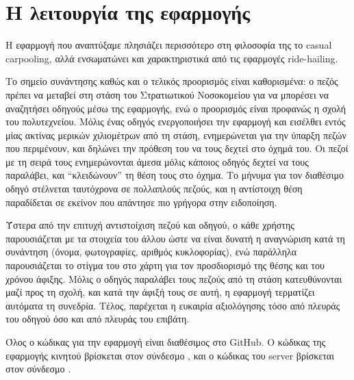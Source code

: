\documentclass[../thesis.tex]{subfiles}
\begin{document}
\section{Η λειτουργία της εφαρμογής}

Η εφαρμογή που αναπτύξαμε πλησιάζει περισσότερο στη φιλοσοφία της το casual carpooling, αλλά ενσωματώνει και χαρακτηριστικά από τις εφαρμογές ride-hailing.

Το σημείο συνάντησης καθώς και ο τελικός προορισμός είναι καθορισμένα: ο πεζός πρέπει να μεταβεί στη στάση του Στρατιωτικού Νοσοκομείου για να μπορέσει να αναζητήσει οδηγούς μέσω της εφαρμογής, ενώ ο προορισμός είναι προφανώς η σχολή του πολυτεχνείου.
Μόλις ένας οδηγός ενεργοποιήσει την εφαρμογή και εισέλθει εντός μίας ακτίνας μερικών χιλιομέτρων από τη στάση, ενημερώνεται για την ύπαρξη πεζών που περιμένουν, και δηλώνει την πρόθεση του να τους δεχτεί στο όχημά του.
Οι πεζοί με τη σειρά τους ενημερώνονται άμεσα μόλις κάποιος οδηγός δεχτεί να τους παραλάβει, και ``κλειδώνουν'' τη θέση τους στο όχημα.
Το μήνυμα για τον διαθέσιμο οδηγό στέλνεται ταυτόχρονα σε πολλαπλούς πεζούς, και η αντίστοιχη θέση παραδίδεται σε εκείνον που απάντησε πιο γρήγορα στην ειδοποίηση.

Ύστερα από την επιτυχή αντιστοίχιση πεζού και οδηγού, ο κάθε χρήστης παρουσιάζεται με τα στοιχεία του άλλου ώστε να είναι δυνατή η αναγνώριση κατά τη συνάντηση (όνομα, φωτογραφίες, αριθμός κυκλοφορίας), ενώ παράλληλα παρουσιάζεται το στίγμα του στο χάρτη για τον προσδιορισμό της θέσης και του χρόνου άφιξης.
Μόλις ο οδηγός παραλάβει τους πεζούς από τη στάση κατευθύνονται μαζί προς τη σχολή, και κατά την άφιξή τους σε αυτή, η εφαρμογή τερματίζει αυτόματα τη συνεδρία.
Τέλος, παρέχεται η ευκαιρία αξιολόγησης τόσο από πλευράς του οδηγού όσο και από πλευράς του επιβάτη.

\bigskip

Όλος ο κώδικας για την εφαρμογή είναι διαθέσιμος στο GitHub.
Ο κώδικας της εφαρμογής κινητού βρίσκεται στον σύνδεσμο \cite{app_code}, και ο κώδικας του server βρίσκεται στον σύνδεσμο \cite{server_code}.
\end{document}
